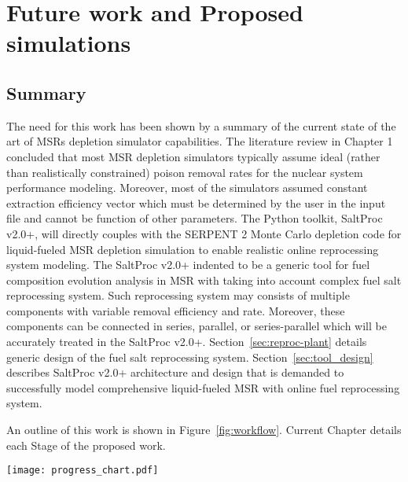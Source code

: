 \chapter[Future work and Proposed simulations]{Future work and Proposed 
simulations}

\section{Summary}
The need for this work has been shown by a summary of the current state of the 
art of \glspl{MSR} depletion simulator capabilities. The literature review in 
Chapter 1 concluded that most \gls{MSR} depletion simulators typically assume 
ideal (rather than realistically constrained) poison removal rates for the 
nuclear system performance modeling. Moreover, most of the simulators assumed 
constant extraction efficiency vector which must be determined by the user in 
the input file and cannot be function of other parameters. The Python toolkit, 
SaltProc v2.0+, will directly couples with the SERPENT 2 Monte Carlo depletion 
code for liquid-fueled \gls{MSR} depletion simulation to enable realistic 
online reprocessing system modeling. The SaltProc v2.0+ indented to be a 
generic tool for fuel composition evolution analysis in \gls{MSR} with taking 
into account complex fuel salt reprocessing system. Such reprocessing system 
may consists of multiple components with variable removal efficiency and rate.
Moreover, these components can be connected in series, parallel, or 
series-parallel which will be accurately treated in the SaltProc v2.0+. 
Section~\ref{sec:reproc-plant} details generic design of the fuel salt 
reprocessing system. Section~\ref{sec:tool_design} describes SaltProc v2.0+ 
architecture and design that is demanded to successfully model comprehensive 
liquid-fueled \gls{MSR} with online fuel reprocessing system. 

An outline of this work is shown in Figure~\ref{fig:workflow}. Current  
Chapter details each Stage of the proposed work.
 \begin{sidewaysfigure}[ht!] %
 	\centering
 	\texttt{[image: progress\_chart.pdf]} 
 	\caption{Workflow for the simulations proposed in this work..}
 	\label{fig:workflow}
 \end{sidewaysfigure}
 \FloatBarrier
 
 
